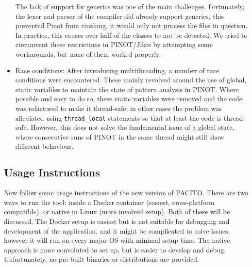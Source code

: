 \begin{itemize}
    The lack of support for generics was one of the main challenges. Fortunately, the lexer and parser of the compiler did already support generics, this prevented Pinot from crashing, it would only not process the files in question. In practice, this causes over half of the classes to not be detected. We tried to circumvent these restrictions in PINOT/Jikes by attempting some workarounds, but none of them worked properly.
    
    \item Race conditions: After introducing multithreading, a number of race conditions were encountered. These mainly revolved around the use of global, static variables to maintain the state of pattern analysis in PINOT. Where possible and easy to do so, these static variables were removed and the code was refactored to make it thread-safe; in other cases the problem was alleviated using {\tt thread\_local} statements so that at least the code is thread-safe. However, this does not solve the fundamental issue of a global state, where consecutive runs of PINOT in the same thread might still show different behaviour.
\end{itemize}

\subsection{Usage Instructions}
Now follow some usage instructions of the new version of PACITO. There are two ways to run the tool: inside a Docker container (easiest, cross-platform compatible), or native in Linux (more involved setup). Both of these will be discussed. The Docker setup is easiest but is not suitable for debugging and development of the application, and it might be complicated to solve issues, however it will run on every major OS with minimal setup time. The native approach is more convoluted to set up, but is easier to develop and debug. Unfortunately, no pre-built binaries or distributions are provided.

